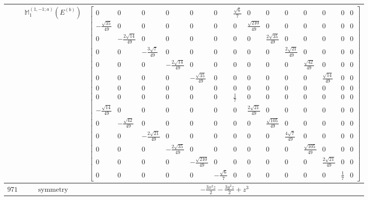 \documentclass[fleqn,8pt,landscape]{jsarticle}
\begin{document}
\begin{longtable}{ccc}
$  $ & $ \mathbb{M}_{1}^{(1,-1;a)}(E^{(b)}) $ & $ \begin{bmatrix} 0 & 0 & 0 & 0 & 0 & 0 & \frac{\sqrt{6}}{7} & 0 & 0 & 0 & 0 & 0 & 0 & 0 \\ - \frac{\sqrt{35}}{49} & 0 & 0 & 0 & 0 & 0 & 0 & \frac{\sqrt{210}}{49} & 0 & 0 & 0 & 0 & 0 & 0 \\ 0 & - \frac{2 \sqrt{14}}{49} & 0 & 0 & 0 & 0 & 0 & 0 & \frac{2 \sqrt{35}}{49} & 0 & 0 & 0 & 0 & 0 \\ 0 & 0 & - \frac{3 \sqrt{7}}{49} & 0 & 0 & 0 & 0 & 0 & 0 & \frac{2 \sqrt{21}}{49} & 0 & 0 & 0 & 0 \\ 0 & 0 & 0 & - \frac{2 \sqrt{14}}{49} & 0 & 0 & 0 & 0 & 0 & 0 & \frac{\sqrt{42}}{49} & 0 & 0 & 0 \\ 0 & 0 & 0 & 0 & - \frac{\sqrt{35}}{49} & 0 & 0 & 0 & 0 & 0 & 0 & \frac{\sqrt{14}}{49} & 0 & 0 \\ 0 & 0 & 0 & 0 & 0 & 0 & 0 & 0 & 0 & 0 & 0 & 0 & 0 & 0 \\ 0 & 0 & 0 & 0 & 0 & 0 & \frac{1}{7} & 0 & 0 & 0 & 0 & 0 & 0 & 0 \\ - \frac{\sqrt{14}}{49} & 0 & 0 & 0 & 0 & 0 & 0 & \frac{2 \sqrt{21}}{49} & 0 & 0 & 0 & 0 & 0 & 0 \\ 0 & - \frac{\sqrt{42}}{49} & 0 & 0 & 0 & 0 & 0 & 0 & \frac{\sqrt{105}}{49} & 0 & 0 & 0 & 0 & 0 \\ 0 & 0 & - \frac{2 \sqrt{21}}{49} & 0 & 0 & 0 & 0 & 0 & 0 & \frac{4 \sqrt{7}}{49} & 0 & 0 & 0 & 0 \\ 0 & 0 & 0 & - \frac{2 \sqrt{35}}{49} & 0 & 0 & 0 & 0 & 0 & 0 & \frac{\sqrt{105}}{49} & 0 & 0 & 0 \\ 0 & 0 & 0 & 0 & - \frac{\sqrt{210}}{49} & 0 & 0 & 0 & 0 & 0 & 0 & \frac{2 \sqrt{21}}{49} & 0 & 0 \\ 0 & 0 & 0 & 0 & 0 & - \frac{\sqrt{6}}{7} & 0 & 0 & 0 & 0 & 0 & 0 & \frac{1}{7} & 0 \end{bmatrix} $ \\ \hline
$ 971 $ & $ \text{symmetry} $ & $ - \frac{3 x^{2} z}{2} - \frac{3 y^{2} z}{2} + z^{3} $ \\

\end{longtable}
\end{document}
